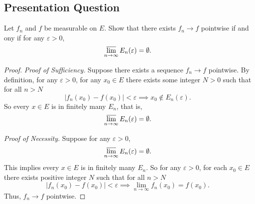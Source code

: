 \documentclass[class=book, crop=false]{standalone}
\begin{document}
        \subsection{Presentation Question}
        \begin{question}
            Let $f_n$ and $f$ be measurable on $E$. Show that there exists $f_n \rightarrow f$ pointwise if and ony if for any $\varepsilon > 0$,
            \begin{equation*}
                \varlimsup_{n \rightarrow \infty} E_n(\varepsilon) = \emptyset.
            \end{equation*}
        \end{question}
        \begin{proof}
            \textit{Proof of Sufficiency.} Suppose there exists a sequence $f_n \rightarrow f$ pointwise. By definition, for any $\varepsilon > 0$, for any $x_0 \in E$ there exists some integer $N > 0$ such that for all $n > N$
            \begin{equation*}
                |f_n(x_0) - f(x_0)| < \varepsilon \implies x_0 \notin E_n(\varepsilon).
            \end{equation*}
            So every $x \in E$ is in finitely many $E_n$, that is,
            \begin{equation*}
                 \varlimsup_{n \rightarrow \infty} E_n(\varepsilon) = \emptyset.
            \end{equation*}

            \noindent \textit{Proof of Necessity.} Suppose for any $\varepsilon > 0$,
            \begin{equation*}
                 \varlimsup_{n \rightarrow \infty} E_n(\varepsilon) = \emptyset.
            \end{equation*}
            This implies every $x \in E$ is in finitely many $E_n$. So for any $\varepsilon > 0$, for each $x_0 \in E$ there exists positive integer $N$ such that for all $n > N$
            \begin{equation*}
                |f_n(x_0) - f(x_0)| < \varepsilon \implies \lim_{n \rightarrow \infty} f_n(x_0) = f(x_0).
            \end{equation*}
            Thus, $f_n \rightarrow f$ pointwise.
        \end{proof}
\end{document}
